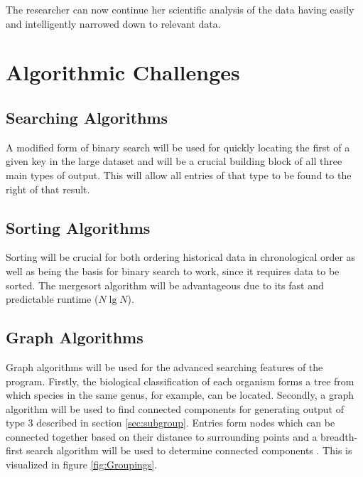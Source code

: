 \documentclass{article}
\begin{document}
The researcher can now continue her scientific analysis of the data having easily and intelligently narrowed down to relevant data.

\section{Algorithmic Challenges}
\subsection{Searching Algorithms}
A modified form of binary search will be used for quickly locating the first of a given key in the large dataset and will be a crucial building block of all three main types of output. This will allow all entries of that type to be found to the right of that result.

\subsection{Sorting Algorithms}
Sorting will be crucial for both ordering historical data in chronological order as well as being the basis for binary search to work, since it requires data to be sorted. The mergesort algorithm will be advantageous due to its fast and predictable runtime ($N\lg N$).

\subsection{Graph Algorithms}\label{sec:graphalgs}
Graph algorithms will be used for the advanced searching features of the program. Firstly, the biological classification of each organism forms a tree from which species in the same genus, for example, can be located. Secondly, a graph algorithm will be used to find connected components for generating output of type 3 described in section \ref{sec:subgroup}. Entries form nodes which can be connected together based on their distance to surrounding points and a breadth-first search algorithm will be used to determine connected components \citep{broder2000graph}. This is visualized in figure \ref{fig:Groupings}.
\end{document}
